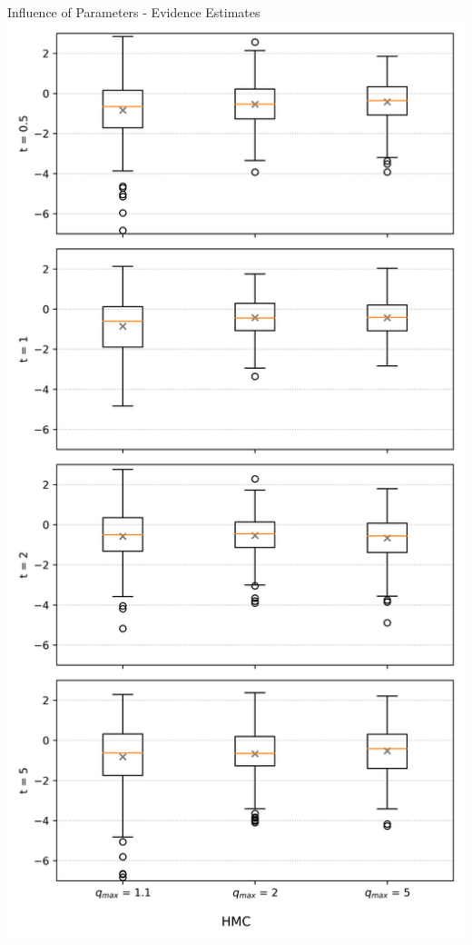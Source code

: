 \documentclass[]{beamer}
\begin{document}
\begin{frame}{Influence of Parameters - Evidence Estimates}
    \includegraphics[scale=0.25]{figs/results/params/logZ_diffs_hmc.png}
  \end{frame}
\end{document}
